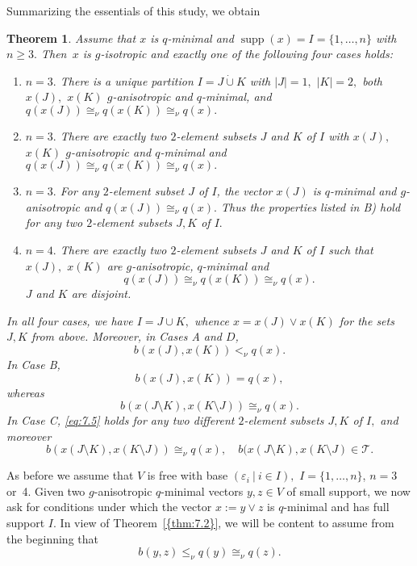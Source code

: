 \documentclass [12pt,a4paper,reqno]{amsart}
\newtheorem{thm}{Theorem} [section]
\begin{document}
Summarizing the essentials of this study, we obtain

\begin{thm}\label{thm:7.2}
Assume that $x$ is $q$-minimal and ${\operatorname{supp}}(x)=I=\{1,\dots, n\}$
with $n\ge3.$ Then~$x$ is $g$-isotropic and exactly one of the
following four cases holds:

\begin{enumerate} {\setlength{\itemsep}{2pt}}
\item[A)] $n=3.$ There is a unique partition $I=J\dot\cup K$ with
$|J|=1,$ $|K|=2,$ both $x(J),$ $x(K)$ $g$-anisotropic and
$q$-minimal, and $q(x(J))\cong_\nu q(x(K))\cong_\nu q(x).$

\item[B)] $n=3.$ There are exactly two $2$-element subsets $J$ and
$K$ of $I$ with $x(J),$ $x(K)$ $g$-anisotropic and $q$-minimal and
$q(x(J))\cong_\nu q(x(K))\cong_\nu q(x).$

\item[C)] $n=3.$ For any $2$-element subset $J$ of $I$, the vector
$x(J)$ is $q$-minimal and $g$-anisotropic and $q(x(J))\cong_\nu
q(x).$ Thus the properties listed in B) hold for \textit{any} two
$2$-element subsets $J,K$ of $I.$

\item[D)] $n=4.$ There are exactly two $2$-element subsets $J$ and
$K$ of $I$ such that $x(J),$ $x(K)$ are $g$-anisotropic,
$q$-minimal and
$$q(x(J))\cong_\nu q(x(K))\cong_\nu q(x).$$
$J$ and $K$ are disjoint.
\end{enumerate}

In all four cases, we have $I=J\cup K,$ whence $x=x(J)\vee x(K)$
for the sets $J,K$ from above. Moreover, in Cases A and $D$,
\begin{equation}\label{eq:7.4}
b(x(J),x(K))<_\nu q(x). \end{equation} In Case B,
\begin{equation}\label{eq:7.5}
b(x(J),x(K))= q(x), \end{equation} whereas
\begin{equation}\label{eq:7.6}
b(x(J{\setminus} K),x(K{\setminus} J))\cong_\nu q(x). \end{equation}
In Case C, \eqref{eq:7.5} holds for any two different $2$-element
subsets $J,K$ of $I,$ and moreover
\begin{equation}\label{eq:7.7}
b(x(J{\setminus} K),x(K{\setminus} J))\cong_\nu q(x),\quad
b(x(J{\setminus} K),x(K{\setminus} J)\in {\mathcal T}.
\end{equation}
\end{thm}
{\vskip 1.5mm \noindent}
As before we assume that $V$ is free with base
$({\varepsilon}_i {\ {|} \ }i\in I),$ $I=\{1,\dots,n\}$, $n=3$ or~4. Given two
$g$-anisotropic $q$-minimal vectors $y,z\in  V$ of small support,
we now ask for conditions under which the vector $x:=y\vee z$ is
$q$-minimal and has full support $I.$ In view of {Theorem~\ref{{thm:7.2}}},
we will be content to assume from the beginning that
\begin{equation}\label{eq:7.6.b}
b(y,z)\le_\nu q(y)\cong_\nu q(z).
\end{equation}
\end{document}
